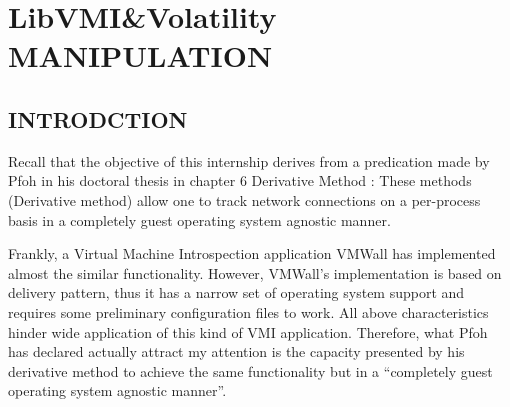 
\chapter{LibVMI\&Volatility MANIPULATION} %

\label{Chapter7} %



\section{INTRODCTION}
Recall that the objective of this internship derives from a predication made by Pfoh in his doctoral thesis in chapter 6 
Derivative Method \cite{Reference7}: These methods (Derivative method) allow one to track network connections on a per-process
basis in a completely guest operating system agnostic manner.

Frankly, a Virtual Machine Introspection application VMWall \cite{Reference2} has implemented almost the similar functionality. 
However, VMWall’s implementation is based on delivery pattern, thus it has a narrow set of operating system support and requires
some preliminary configuration files to work. All above characteristics hinder wide application of this kind of VMI application.
Therefore, what Pfoh has declared actually attract my attention is the capacity presented by his derivative method to achieve
the same functionality but in a “completely guest operating system agnostic manner”.

